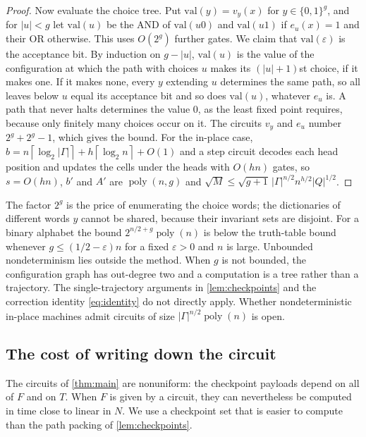 \documentclass[11pt]{article}
\theoremstyle{definition}
\theoremstyle{remark}
\newcommand{\bits}{\{0,1\}}
\newcommand{\poly}{\operatorname{poly}}
\newcommand{\ceil}[1]{\left\lceil #1\right\rceil}
\numberwithin{equation}{section}
\begin{document}
\begin{proof}
Now evaluate the choice tree.  Put $\mathrm{val}(y)=v_y(x)$ for
$y\in\bits^g$, and for $|u|<g$ let $\mathrm{val}(u)$ be the AND of
$\mathrm{val}(u0)$ and $\mathrm{val}(u1)$ if $e_u(x)=1$ and their OR
otherwise.  This uses $O(2^g)$ further gates.  We claim that
$\mathrm{val}(\varepsilon)$ is the acceptance bit.  By induction on $g-|u|$,
$\mathrm{val}(u)$ is the value of the configuration at which the path with
choices $u$ makes its $(|u|+1)$st choice, if it makes one.  If it makes
none, every $y$ extending $u$ determines the same path, so all leaves below
$u$ equal its acceptance bit and so does $\mathrm{val}(u)$, whatever $e_u$
is.  A path that never halts determines the value $0$, as the least fixed
point requires, because only finitely many choices occur on it.  The
circuits $v_y$ and $e_u$ number $2^g+2^g-1$, which gives the bound.  For
the in-place case, $b=n\ceil{\log_2|\Gamma|}+h\ceil{\log_2n}+O(1)$ and
a step circuit decodes each head position and updates the cells under
the heads with $O(hn)$ gates, so $s=O(hn)$, $b'$ and $A'$ are $\poly(n,g)$ and
$\sqrt M\leq\sqrt{g+1}\,|\Gamma|^{n/2}n^{h/2}|Q|^{1/2}$.
\end{proof}

The factor $2^g$ is the price of enumerating the choice words; the
dictionaries of different words $y$ cannot be shared, because their
invariant sets are disjoint.  For a binary alphabet the bound
$2^{n/2+g}\poly(n)$ is below the truth-table bound whenever
$g\leq(1/2-\varepsilon)n$ for a fixed $\varepsilon>0$ and $n$ is large.  Unbounded nondeterminism lies outside the method.
When $g$ is not bounded, the configuration graph has out-degree two and a
computation is a tree rather than a trajectory.  The single-trajectory
arguments in \cref{lem:checkpoints} and the correction identity
\cref{eq:identity} do not directly apply.  Whether nondeterministic in-place machines admit circuits of
size $|\Gamma|^{n/2}\poly(n)$ is open.

\subsection{The cost of writing down the circuit}\label{sec:preprocessing}

The circuits of \cref{thm:main} are nonuniform: the checkpoint payloads
depend on all of $F$ and on $T$.  When $F$ is given by a circuit, they can
nevertheless be computed in time close to linear in $N$.  We use a
checkpoint set that is easier to compute than the path packing of
\cref{lem:checkpoints}.
\end{document}
